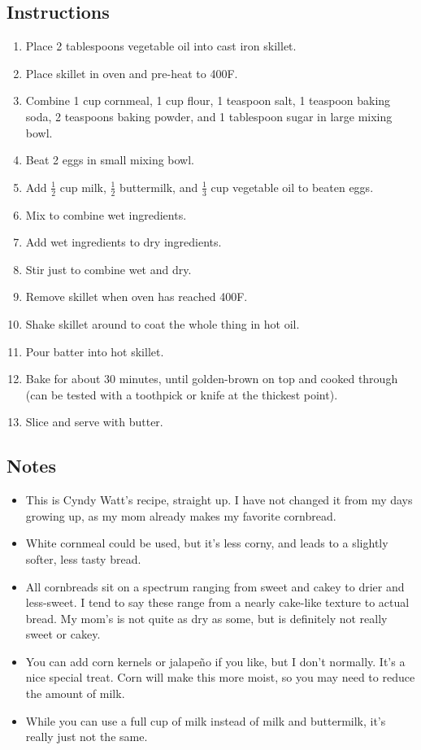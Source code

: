 \begin{multicols}{2}
\subsection*{Instructions}
\begin{enumerate}
    \item Place 2 tablespoons vegetable oil into cast iron skillet.
    \item Place skillet in oven and pre-heat to 400F.
    \item Combine 1 cup cornmeal, 1 cup flour, 1 teaspoon salt, 1 teaspoon baking soda, 2 teaspoons baking powder, and 1 tablespoon sugar in large mixing bowl.
    \item Beat 2 eggs in small mixing bowl.
    \item Add \( \frac{1}{2} \) cup milk, \( \frac{1}{2} \) buttermilk, and \( \frac{1}{3} \) cup vegetable oil to beaten eggs.
    \item Mix to combine wet ingredients.
    \item Add wet ingredients to dry ingredients.
    \item Stir just to combine wet and dry.
    \item Remove skillet when oven has reached 400F.
    \item Shake skillet around to coat the whole thing in hot oil.
    \item Pour batter into hot skillet.
    \item Bake for about 30 minutes, until golden-brown on top and cooked through (can be tested with a toothpick or knife at the thickest point).
    \item Slice and serve with butter.
\end{enumerate}

\subsection*{Notes}
\begin{itemize}
    \item This is Cyndy Watt's recipe, straight up. I have not changed it from my days growing up, as my mom already makes my favorite cornbread.
    \item White cornmeal could be used, but it's less corny, and leads to a slightly softer, less tasty bread.
    \item All cornbreads sit on a spectrum ranging from sweet and cakey to drier and less-sweet. I tend to say these range from a nearly cake-like texture to actual bread. My mom's is not quite as dry as some, but is definitely not really sweet or cakey.
    \item You can add corn kernels or jalapeño if you like, but I don't normally. It's a nice special treat. Corn will make this more moist, so you may need to reduce the amount of milk.
    \item While you can use a full cup of milk instead of milk and buttermilk, it's really just not the same.
\end{itemize}
\end{multicols}
\clearpage